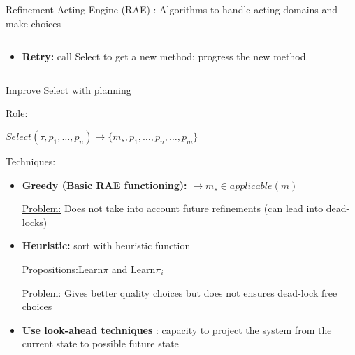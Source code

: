 \begin{frame}{Refinement Acting Engine (RAE)\cite{ghallabAutomatedPlanningActing2016} : Algorithms to handle acting domains and make choices}
\begin{columns}
\begin{column}{0.65\textwidth}
\begin{itemize}
            \item \textbf{Retry:} call Select to get a new method; progress the new method.
        \end{itemize}
    \end{column}
\end{columns}

    
\end{frame}

\begin{frame}{Improve Select with planning}
    \begin{center}
        
    Role:
    
    $Select(\tau, p_1,\dots,p_n) \rightarrow \{m_s, p_1, \dots, p_n,\dots,p_m\}$

    \end{center}

    Techniques:
    \begin{itemize}

    \item \textbf{Greedy (Basic RAE functioning):} $\rightarrow m_s \in applicable(m)$
    \pause
    
    \underline{Problem:} Does not take into account future refinements (can lead into dead-locks)
    \pause
    
    \item \textbf{Heuristic:} sort with heuristic function
    \pause
    
    \underline{Propositions:}Learn$\pi$ and Learn$\pi_i$  \cite{patraDeliberativeActingOnline2021}
    \pause
    
    \underline{Problem:} Gives better quality choices but does not ensures dead-lock free choices
    \pause
    \item \textbf<5->{Use look-ahead techniques} : capacity to project the system from the current state to possible future state

    \end{itemize}
\end{frame}
